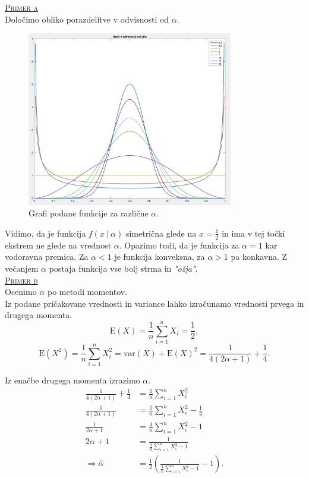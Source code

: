 \documentclass[a4paper,12pt]{article}
\begin{document}
\noindent
\textsc{\underline{Primer a}}
\\
Določimo obliko porazdelitve v odvisnosti od $\alpha$. 
\begin{figure}[ht!]
    \centering
    \includegraphics[width=90mm]{grafi.png}
    \caption{Grafi podane funkcije za različne $\alpha$.}
\end{figure}
Vidimo, da je funkcija $f(x \ | \ \alpha)$ simetrična glede na $x = \frac{1}{2}$ in ima v tej točki ekstrem ne glede na vrednost $\alpha$. Opazimo tudi, da je funkcija za $\alpha = 1$ kar vodoravna premica. Za $\alpha < 1$ je funkcija konveksna, za $\alpha > 1$ pa konkavna. 
Z večanjem $\alpha$ postaja funkcija vse bolj strma in \textit{"ožja"}.
\\

\noindent
\textsc{\underline{Primer b}}
\\
Ocenimo $\alpha$ po metodi momentov.
\\
Iz podane pričakovane vrednosti in variance lahko izračunamo vrednosti prvega in drugega momenta.
$$ \text{E}(X) = \frac{1}{n} \sum_{i = 1}^{n} X_i = \frac{1}{2}, $$
$$ \text{E}(X^2) = \frac{1}{n} \sum_{i = 1}^{n} X_i^2 = \text{var}(X) + \text{E}(X)^2 = \frac{1}{4(2 \alpha + 1)} + \frac{1}{4}. $$

Iz enačbe drugega momenta izrazimo $\alpha$.
\begin{align*}
    \frac{1}{4(2 \alpha + 1)} + \frac{1}{4} &= \frac{1}{n} \sum_{i = 1}^{n} X_i^2 
    \\
    \frac{1}{4(2 \alpha + 1)} &= \frac{1}{n} \sum_{i = 1}^{n} X_i^2 - \frac{1}{4} 
    \\
    \frac{1}{2 \alpha + 1} &= \frac{4}{n} \sum_{i = 1}^{n} X_i^2 - 1 
    \\
    2 \alpha + 1 &= \frac{1}{\frac{4}{n} \sum_{i = 1}^{n} X_i^2 - 1}
    \\
    \Rightarrow \hat{\alpha} &= \frac{1}{2} \left( \frac{1}{\frac{4}{n} \sum_{i = 1}^{n} X_i^2 - 1} - 1 \right).
\end{align*}
\end{document}
